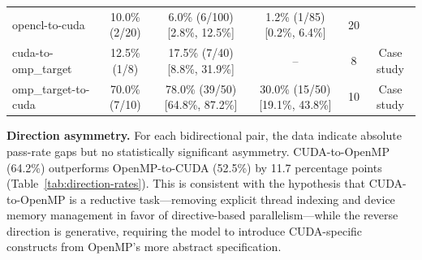 \documentclass{article}
\begin{document}
\begin{table}[t]
\begin{tabular}{@{}lccccc@{}}
opencl-to-cuda & 10.0\% (2/20) & 6.0\% (6/100) [2.8\%, 12.5\%] & 1.2\% (1/85) [0.2\%, 6.4\%] & 20 & \\ %
cuda-to-omp\_target & 12.5\% (1/8) & 17.5\% (7/40) [8.8\%, 31.9\%] & -- & 8 & Case study \\ %
omp\_target-to-cuda & 70.0\% (7/10) & 78.0\% (39/50) [64.8\%, 87.2\%] & 30.0\% (15/50) [19.1\%, 43.8\%] & 10 & Case study \\ %
\bottomrule
\end{tabular}
\end{table}

\textbf{Direction asymmetry.} For each bidirectional pair, the data indicate absolute pass-rate gaps but no statistically significant asymmetry. CUDA-to-OpenMP (64.2\%) outperforms OpenMP-to-CUDA (52.5\%) by 11.7 percentage points (Table~\ref{tab:direction-rates}). This is consistent with the hypothesis that CUDA-to-OpenMP is a reductive task---removing explicit thread indexing and device memory management in favor of directive-based parallelism---while the reverse direction is generative, requiring the model to introduce CUDA-specific constructs from OpenMP's more abstract specification.
\end{document}
